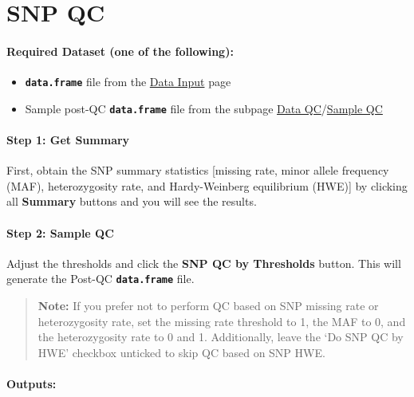 \documentclass[
]{book}
\begin{document}
\section{SNP QC}\label{snp-qc}

\paragraph*{Required Dataset (one of the following):}\label{required-dataset-one-of-the-following-2}

\begin{itemize}
\item
  {\textbf{\texttt{data.frame}}} file from the \ul{Data Input} page
\item
  Sample post-QC {\textbf{\texttt{data.frame}}} file from the subpage \ul{Data QC}/\ul{Sample QC}
\end{itemize}

\paragraph*{Step 1: Get Summary}\label{step-1-get-summary-1}

First, obtain the SNP summary statistics {[}missing rate, minor allele frequency (MAF), heterozygosity rate, and Hardy-Weinberg equilibrium (HWE){]} by clicking all {\textbf{Summary}} buttons and you will see the results.

\paragraph*{Step 2: Sample QC}\label{step-2-sample-qc-1}

Adjust the thresholds and click the {\textbf{SNP QC by Thresholds}} button. This will generate the Post-QC {\textbf{\texttt{data.frame}}} file.

\begin{quote}
\textbf{Note:} If you prefer not to perform QC based on SNP missing rate or heterozygosity rate, set the missing rate threshold to 1, the MAF to 0, and the heterozygosity rate to 0 and 1. Additionally, leave the `Do SNP QC by HWE' checkbox unticked to skip QC based on SNP HWE.
\end{quote}

\paragraph*{Outputs:}\label{outputs-2}
\end{document}
